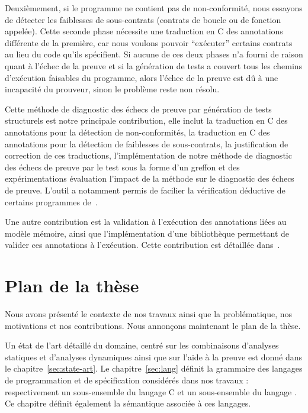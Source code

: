 Deuxièmement, si le programme ne contient pas de non-conformité, nous essayons
de détecter les faiblesses de sous-contrats (contrats de boucle ou de fonction
appelée).
Cette seconde phase nécessite une traduction en C des annotations \acsl
différente de la première, car nous voulons pouvoir ``exécuter'' certains
contrats au lieu du code qu'ils spécifient.
Si aucune de ces deux phases n'a fourni de raison quant à l'échec de la preuve
et si la génération de tests a couvert tous les chemins d'exécution faisables
du programme, alors l'échec de la preuve est dû à une incapacité du prouveur,
sinon le problème reste non résolu.

Cette méthode de diagnostic des échecs de preuve par génération de tests
structurels est notre principale contribution, elle inclut la traduction en C
des annotations \acsl pour la détection de non-conformités, la traduction en C
des annotations \acsl pour la détection de faiblesses de sous-contrats, la
justification de correction de ces traductions, l'implémentation de notre
méthode de diagnostic des échecs de preuve par le test sous la forme d'un
greffon \framac et des expérimentations évaluation l'impact de la méthode sur le
diagnostic des échecs de preuve.
L'outil a notamment permis de facilier la vérification déductive de
certains programmes de~\cite{Genestier/TAP15}.

Une autre contribution est la validation à l'exécution des annotations \acsl
liées au modèle mémoire, ainsi que l'implémentation d'une bibliothèque
permettant de valider ces annotations à l'exécution.
Cette contribution est détaillée dans~\cite{Kosmatov/RV13}. 


\section{Plan de la thèse}
\label{sec:plan}


Nous avons présenté le contexte de nos travaux ainsi que la problématique, nos
motivations et nos contributions.
Nous annonçons maintenant le plan de la thèse.

Un état de l'art détaillé du domaine, centré sur les combinaisons d'analyses
statiques et d'analyses dynamiques ainsi que sur l'aide à la preuve est
donné dans le chapitre~\ref{sec:state-art}.
Le chapitre~\ref{sec:lang} définit la grammaire des langages de programmation et
de spécification considérés dans nos travaux : respectivement un sous-ensemble
du langage C et un sous-ensemble du langage \acsl.
Ce chapitre définit également la sémantique associée à ces langages.

